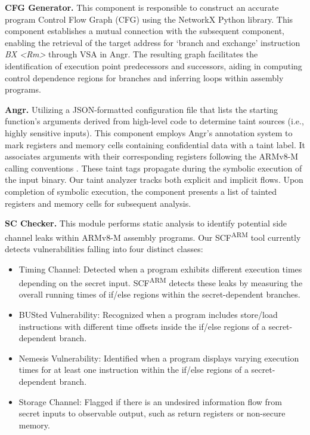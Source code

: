 \textbf{CFG Generator.} This component is responsible to construct an accurate program Control Flow Graph (CFG) using the NetworkX \cite{networkX} Python library. This component establishes a mutual connection with the subsequent component, enabling the retrieval of the target address for ‘branch and exchange’ instruction \textit{BX <Rm>} through \gls{VSA} in Angr. The resulting graph facilitates the identification of execution point predecessors and successors, aiding in computing control dependence regions for branches and inferring loops within assembly programs.

\textbf{Angr.} Utilizing a JSON-formatted configuration file that lists the starting function's arguments derived from high-level code to determine taint sources (i.e., highly sensitive inputs). This component employs Angr's annotation system to mark registers and memory cells containing confidential data with a taint label. It associates arguments with their corresponding registers following the ARMv8-M calling conventions \cite{armv8m_ref_manual}. These taint tags propagate during the symbolic execution of the input binary. Our taint analyzer tracks both explicit and implicit flows. Upon completion of symbolic execution, the component presents a list of tainted registers and memory cells for subsequent analysis. 

\textbf{SC Checker.} This module performs static analysis to identify potential side channel leaks within ARMv8-M assembly programs. Our \gls{SCF}\textsuperscript{ARM} tool currently detects vulnerabilities falling into four distinct classes:

\begin{itemize}

\item Timing Channel: Detected when a program exhibits different execution times depending on the secret input. \gls{SCF}\textsuperscript{ARM} detects these leaks by measuring the overall running times of if/else regions within the secret-dependent branches.

\item BUSted Vulnerability: Recognized when a program includes store/load instructions with different time offsets inside the if/else regions of a secret-dependent branch.

\item Nemesis Vulnerability: Identified when a program displays varying execution times for at least one instruction within the if/else regions of a secret-dependent branch.

\item Storage Channel: Flagged if there is an undesired information flow from secret inputs to observable output, such as return registers or non-secure memory.

\end{itemize}